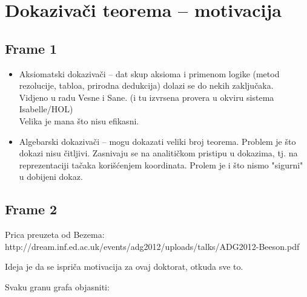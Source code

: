 \documentclass{article}
\begin{document}
\section{Dokaziva\v ci teorema -- motivacija}

\subsection{Frame 1}
\begin{itemize}
\item Aksiomatski dokaziva\v ci -- dat skup aksioma i primenom logike (metod rezolucije, tabloa, prirodna dedukcija) dolazi se do nekih zaklju\v caka. \\
      Vidjeno u radu Vesne i Sane. (i tu izvrsena provera u okviru sistema Isabelle/HOL)\\
      Velika je mana \v sto nisu efikasni.
      
\item Algebarski dokaziva\v ci -- mogu dokazati veliki broj teorema. Problem je \v sto dokazi nisu \v citljivi. Zasnivaju se na analiti\v ckom pristipu u dokazima, tj.
      na reprezentaciji ta\v caka kori\v s\'cenjem koordinata. Prolem je i \v sto nismo "sigurni" u dobijeni dokaz.
  
\end{itemize}

\subsection{Frame 2}

Prica preuzeta od Bezema: http://dream.inf.ed.ac.uk/events/adg2012/uploads/talks/ADG2012-Beeson.pdf

Ideja je da se ispri\v ca motivacija za ovaj doktorat, otkuda sve to.


Svaku granu grafa objasniti:
\end{document}
